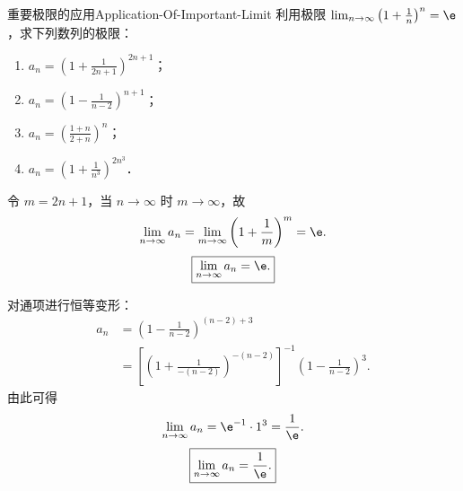 \begin{problem}{重要极限的应用}{Application-Of-Important-Limit}
    利用极限 $\lim_{n\to\infty} \left(1 + \frac{1}{n}\right)^n = \e$，求下列数列的极限：
    \begin{enumerate}
        \item $a_n = \left( 1 + \frac{1}{2n+1} \right)^{2n+1}$；
        \item $a_n = \left( 1 - \frac{1}{n-2} \right)^{n+1}$；
        \item $a_n = \left( \frac{1+n}{2+n} \right)^n$；
        \item $a_n = \left( 1 + \frac{1}{n^3} \right)^{2n^3}$．
    \end{enumerate}
\end{problem}

\begin{solution}

    令 $m = 2n + 1$，当 $n \to \infty$ 时 $m \to \infty$，故
    \begin{equation}
        \lim_{n\to\infty} a_n = \lim_{m\to\infty} \left( 1 + \frac{1}{m} \right)^m = \e.
    \end{equation}
    \begin{equation}
        \boxed{\lim_{n\to\infty} a_n = \e.}
    \end{equation}


    对通项进行恒等变形：
    \begin{equation}
        \begin{aligned}
            a_n & = \left( 1 - \frac{1}{n-2} \right)^{(n-2) + 3}                                                         \\
                & = \left[ \left( 1 + \frac{1}{-(n-2)} \right)^{-(n-2)} \right]^{-1} \left( 1 - \frac{1}{n-2} \right)^3.
        \end{aligned}
    \end{equation}
    由此可得
    \begin{equation}
        \lim_{n\to\infty} a_n = \e^{-1} \cdot 1^3 = \frac{1}{\e}.
    \end{equation}
    \begin{equation}
        \boxed{\lim_{n\to\infty} a_n = \frac{1}{\e}.}
    \end{equation}



\end{solution}
